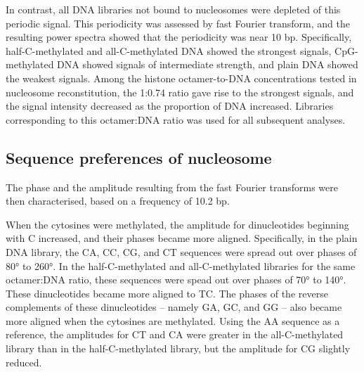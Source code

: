 \documentclass[parskip=full, numbers=noenddot]{scrreprt}
\begin{document}
In contrast, all DNA libraries not bound to nucleosomes were depleted of this periodic signal.  This periodicity was assessed by fast Fourier transform, and the resulting power spectra showed that the periodicity was near 10 bp.  Specifically, half-C-methylated and all-C-methylated DNA showed the strongest signals, %
CpG-methylated DNA showed signals of intermediate strength, and plain DNA showed the weakest signals.  Among the histone octamer-to-DNA concentrations tested in nucleosome reconstitution, the 1:0.74 ratio gave rise to the strongest signals, and the signal intensity decreased as the proportion of DNA increased.  Libraries corresponding to this octamer:DNA ratio was used for all subsequent analyses.

\subsection{Sequence preferences of nucleosome}
\label{ssec:nuseqpref}

The phase and the amplitude resulting from the fast Fourier transforms were then characterised, based on a frequency of 10.2 bp.


When the cytosines were methylated, the amplitude for dinucleotides beginning with C increased, and their phases became more aligned. %
Specifically, in the plain DNA library, the CA, CC, CG, and CT sequences were spread out over phases of \ang{80} to \ang{260}.  In the half-C-methylated and all-C-methylated libraries for the same octamer:DNA ratio, these sequences were spead out over phases of \ang{70} to \ang{140}.  These dinucleotides became more aligned to TC.  The phases of the reverse complements of these dinucleotides -- namely GA, GC, and GG -- also became more aligned when the cytosines are methylated.   Using the AA sequence as a reference, the amplitudes for CT and CA were greater in the all-C-methylated library than in the half-C-methylated library, but the amplitude for CG slightly reduced.
\end{document}
